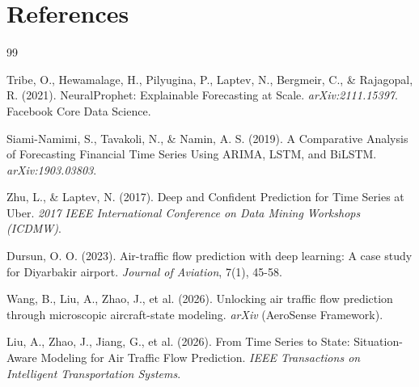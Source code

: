 \documentclass[12pt,a4paper]{article}
\begin{document}
\section{References}

\begin{thebibliography}{99}

Tribe, O., Hewamalage, H., Pilyugina, P., Laptev, N., Bergmeir, C., \& Rajagopal, R. (2021).
\newblock NeuralProphet: Explainable Forecasting at Scale.
\newblock \textit{arXiv:2111.15397}. Facebook Core Data Science.

Siami-Namimi, S., Tavakoli, N., \& Namin, A. S. (2019).
\newblock A Comparative Analysis of Forecasting Financial Time Series Using ARIMA, LSTM, and BiLSTM.
\newblock \textit{arXiv:1903.03803}.

Zhu, L., \& Laptev, N. (2017).
\newblock Deep and Confident Prediction for Time Series at Uber.
\newblock \textit{2017 IEEE International Conference on Data Mining Workshops (ICDMW)}.

Dursun, O. O. (2023).
\newblock Air-traffic flow prediction with deep learning: A case study for Diyarbakir airport.
\newblock \textit{Journal of Aviation}, 7(1), 45-58.

Wang, B., Liu, A., Zhao, J., et al. (2026).
\newblock Unlocking air traffic flow prediction through microscopic aircraft-state modeling.
\newblock \textit{arXiv} (AeroSense Framework).

Liu, A., Zhao, J., Jiang, G., et al. (2026).
\newblock From Time Series to State: Situation-Aware Modeling for Air Traffic Flow Prediction.
\newblock \textit{IEEE Transactions on Intelligent Transportation Systems}.

\end{thebibliography}
\end{document}
